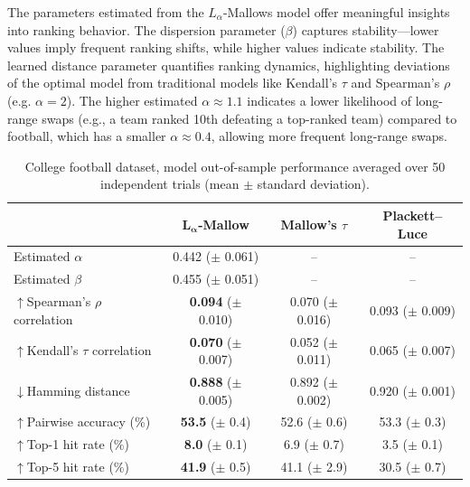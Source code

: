 \documentclass{article}
\begin{document}


The parameters estimated from the \(L_\alpha\)-Mallows model offer meaningful insights into ranking behavior. The dispersion parameter (\(\beta\)) captures stability—lower values imply frequent ranking shifts, while higher values indicate stability. The learned distance parameter quantifies ranking dynamics, highlighting deviations of the optimal model from traditional models like Kendall's $\tau$ and Spearman's $\rho$ (e.g. $\alpha=2$).
The higher estimated $\alpha \approx 1.1$ indicates a lower likelihood of long-range swaps (e.g., a team ranked 10th defeating a top-ranked team) compared to football, which has a smaller $\alpha \approx 0.4$, allowing more frequent long-range swaps.


\begin{table}[h!]
\centering
\setlength{\tabcolsep}{8pt}
\begin{tabular}{|l|c|c|c|}
\hline
 & \textbf{$\boldsymbol{L}_{\boldsymbol{\alpha}}$-Mallow} & {Mallow's $\tau$} & {Plackett--Luce} \\
\hline
Estimated $\alpha$ & 0.442 \;($\pm$ 0.061) & -- & -- \\
Estimated $\beta$  & 0.455 \;($\pm$ 0.051) & -- & -- \\
\hline
$\uparrow$Spearman's $\rho$ correlation      & \textbf{0.094} \;($\pm$ 0.010) & 0.070 \;($\pm$ 0.016) & 0.093 \;($\pm$ 0.009) \\
$\uparrow$Kendall's $\tau$ correlation       & \textbf{0.070} \;($\pm$ 0.007) & 0.052 \;($\pm$ 0.011) & 0.065 \;($\pm$ 0.007) \\
$\downarrow$Hamming distance                 & \textbf{0.888} \;($\pm$ 0.005) & 0.892 \;($\pm$ 0.002) & 0.920 \;($\pm$ 0.001) \\
$\uparrow$Pairwise accuracy (\%)             & \textbf{53.5} \;($\pm$ 0.4)    & 52.6 \;($\pm$ 0.6)    & 53.3 \;($\pm$ 0.3)    \\
$\uparrow$Top-1 hit rate (\%)                & \textbf{8.0}  \;($\pm$ 0.1)    & 6.9  \;($\pm$ 0.7)    & 3.5  \;($\pm$ 0.1)    \\
$\uparrow$Top-5 hit rate (\%)                & \textbf{41.9} \;($\pm$ 0.5)    & 41.1 \;($\pm$ 2.9)    & 30.5 \;($\pm$ 0.7)    \\
\hline
\end{tabular}
\caption{College football dataset, model out-of-sample 
 performance averaged over 50 independent trials (mean $\pm$ standard deviation). }
\label{tab:mle_comparison_football}
\end{table}
\end{document}
